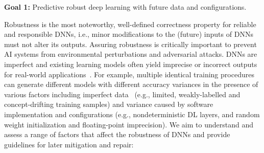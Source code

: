 
\begin{formal}\noindent
{\bf Goal 1:} Predictive robust deep learning with future data and configurations.\label{goal1}
\end{formal}
\noindent
Robustness is the most noteworthy, well-defined correctness property for reliable and responsible DNNs, i.e., minor modifications to the (future) inputs of DNNs must not alter its outputs. Assuring robustness is critically important to prevent AI systems from environmental perturbations and adversarial attacks.
DNNs are imperfect and existing learning models often yield imprecise or incorrect outputs for real-world applications~\cite{pham2020problems,xiao2021nondeterministic}. 
For example, multiple identical training procedures can generate different models with different accuracy variances in the presence of various factors including imperfect data~\cite{zhang2019familial,menzies2012promise,shu2020omni} (e.g., limited, weakly-labelled and concept-drifting training samples) and variance caused by software implementation and configurations  (e.g., nondeterministic DL layers, and random weight initialization and floating-point imprecision). 
We aim to understand and assess a range of factors that affect the robustness of DNNs and provide guidelines for later mitigation and repair: 


